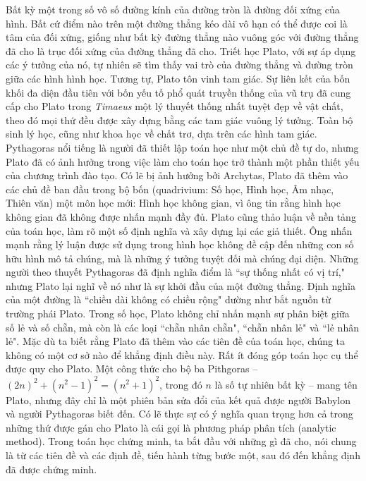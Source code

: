 \begin{multicols}{2}
	\vskip 0.1cm
	Bất kỳ một trong số vô số đường kính của đường tròn là đường đối xứng của hình. Bất cứ điểm nào trên một đường thẳng kéo dài vô hạn có thể được coi là tâm của đối xứng, giống như bất kỳ đường thẳng nào vuông góc với đường thẳng đã cho là trục đối xứng của đường thẳng đã cho. Triết học Plato, với sự áp dụng các ý tưởng của nó, tự nhiên sẽ tìm thấy vai trò của đường thẳng và đường tròn giữa các hình hình học. Tương tự, Plato tôn vinh tam giác.
	\vskip 0.1cm 
	Sự liên kết của bốn khối đa diện đầu tiên với bốn yếu tố phổ quát truyền thống của vũ trụ đã cung cấp cho Plato trong \textit{Timaeus}  một lý thuyết thống nhất tuyệt đẹp về vật chất, theo đó mọi thứ đều được xây dựng bằng các tam giác vuông lý tưởng. Toàn bộ sinh lý học, cũng như khoa học về chất trơ, dựa trên các hình tam giác.
	\vskip 0.1cm
	Pythagoras nổi tiếng là người đã thiết lập toán học như một chủ đề tự do, nhưng Plato đã có ảnh hưởng trong việc làm cho toán học trở thành một phần thiết yếu của chương trình đào tạo.
	\vskip 0.1cm
	Có lẽ bị ảnh hưởng bởi Archytas, Plato đã thêm vào các chủ đề ban đầu trong bộ bốn (quadrivium: Số học, Hình học, Âm nhạc, Thiên văn) một môn học mới: Hình học không gian, vì ông tin rằng hình học không gian đã không được nhấn mạnh đầy đủ. Plato cũng thảo luận về nền tảng của toán học, làm rõ một số định nghĩa và xây dựng lại các giả thiết. Ông nhấn mạnh rằng lý luận được sử dụng trong hình học không đề cập đến những con số hữu hình mô tả chúng, mà là những ý tưởng tuyệt đối mà chúng đại diện. 
	\vskip 0.1cm
	Những người theo thuyết Pythagoras đã định nghĩa điểm là ``sự thống nhất có vị trí," nhưng Plato lại nghĩ về nó như là sự khởi đầu của một đường thẳng.
	\vskip 0.1cm 
	Định nghĩa của một đường là ``chiều dài không có chiều rộng" dường như bắt nguồn từ trường phái Plato.
	\vskip 0.1cm
	Trong số học, Plato không chỉ nhấn mạnh sự phân biệt giữa số lẻ và số chẵn, mà còn là các loại ``chẵn nhân chẵn", ``chẵn nhân lẻ" và ``lẻ nhân lẻ". Mặc dù ta biết rằng Plato đã thêm vào các tiên đề của toán học, chúng ta không có một cơ sở nào để khẳng định điều này.
	\vskip 0.1cm
	Rất ít đóng góp toán học cụ thể được quy cho Plato. Một công thức cho bộ ba Pithgoras -- ${(2n)^2} + {({n^2} - 1)^2} = {({n^2} + 1)^2}$, trong đó  $n$ là số tự nhiên bất kỳ -- mang tên Plato, nhưng đây chỉ là một phiên bản sửa đổi của kết quả được người Babylon và người Pythagoras biết đến. 
	\vskip 0.1cm
	Có lẽ thực sự có ý nghĩa quan trọng hơn cả trong những thứ được gán cho Plato là cái gọi là phương pháp phân tích (analytic method).
	\vskip 0.1cm
	Trong toán học chứng minh, ta bắt đầu với những gì đã cho, nói chung là từ các tiên đề và các định đề, tiến hành từng bước một, sau đó đến khẳng định đã được chứng minh. 

\end{multicols}
